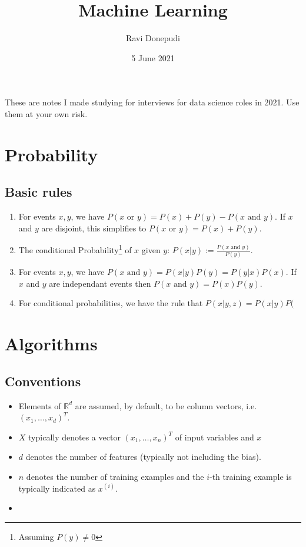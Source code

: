 \documentclass[a4paper]{article}
\title{Machine Learning}
\author{Ravi Donepudi}
\newcommand{\RR}{\mathbb{R}}
\begin{document}
\date{5 June 2021}
\maketitle
These are notes I made studying for interviews for data science roles in 2021. Use them at your own risk. 
\section{Probability}
\subsection{Basic rules}

\begin{enumerate}
    \item For events $x,y$, we have $P(x \text{ or } y)=P(x)+P(y)-P(x \text{ and } y)$. If $x$ and $y$ are disjoint, this simplifies to  $P(x\text{ or } y ) = P(x)+P(y)$.
    \item The conditional Probability\footnote{Assuming $P(y)\neq 0$} of $x$ given $y$: $P(x|y):= \frac{P(x \text{ and } y)}{P(y)} $.
    \item For events $x,y$, we have $P(x \text{ and } y) = P(x|y)P(y) = P(y|x)P(x)$. If $x$ and $y$ are independant events then $P(x \text{ and } y) = P(x)P(y)$.
    \item For conditional probabilities, we have the rule that $P(x|y,z) = P(x|y)P($
    
\end{enumerate}

\section{Algorithms}
\subsection{Conventions}
\begin{itemize}
    \item Elements of $\RR^d$ are assumed, by default, to be column vectors, i.e. $(x_1,\ldots, x_d)^T$.
    \item $X$ typically denotes a vector $(x_1,\ldots, x_n)^T$ of input variables and $x$
    \item $d$ denotes the number of features (typically not including the bias).
    \item $n$ denotes the number of training examples and the $i$-th training example is typically indicated as $x^(i)$.
    \item 
\end{itemize}
\end{document}
